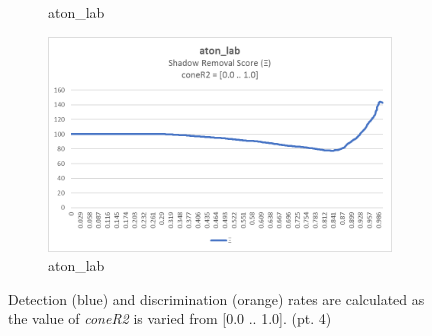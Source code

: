 \begin{appendices}
\begin{figure}
\begin{subfigure}{.45\linewidth}
  \caption{aton\_lab}
\end{subfigure}
\hfill
\begin{subfigure}{.45\linewidth}
  \includegraphics[width=1\linewidth]{figures/appendix/lab_coneR2_score.jpg}
  \caption{aton\_lab}
\end{subfigure}

\caption{Detection (blue) and discrimination (orange) rates are calculated as the value of \textit{coneR2} is varied from [0.0 .. 1.0]. (pt. 4)}
\end{figure}


\end{appendices}

